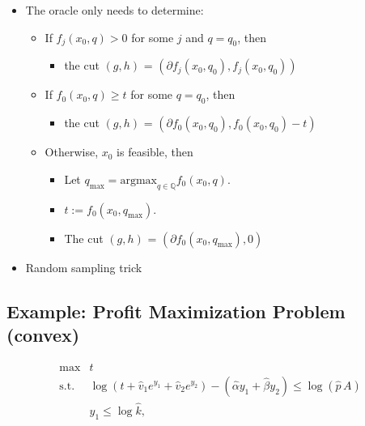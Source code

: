 \documentclass[]{article}
\providecommand{\tightlist}{%
  \setlength{\itemsep}{0pt}\setlength{\parskip}{0pt}}
\begin{document}
\begin{itemize}
\tightlist
\item
  The oracle only needs to determine:

  \begin{itemize}
  \tightlist
  \item
    If \(f_j(x_0, q) > 0\) for some \(j\) and \(q = q_0\), then

    \begin{itemize}
    \tightlist
    \item
      the cut \((g, h)\) = \((\partial f_j(x_0, q_0), f_j(x_0, q_0))\)
    \end{itemize}
  \item
    If \(f_0(x_0, q) \geq t\) for some \(q = q_0\), then

    \begin{itemize}
    \tightlist
    \item
      the cut \((g, h)\) =
      \((\partial f_0(x_0, q_0), f_0(x_0, q_0) - t)\)
    \end{itemize}
  \item
    Otherwise, \(x_0\) is feasible, then

    \begin{itemize}
    \tightlist
    \item
      Let \(q_{\max} = \text{argmax}_{q \in \mathbb Q} f_0(x_0, q)\).
    \item
      \(t := f_0(x_0, q_{\max})\).
    \item
      The cut \((g, h)\) = \((\partial f_0(x_0, q_{\max}), 0)\)
    \end{itemize}
  \end{itemize}
\item
  Random sampling trick
\end{itemize}

\hypertarget{example-profit-maximization-problem-convex}{%
\subsection{Example: Profit Maximization Problem
(convex)}\label{example-profit-maximization-problem-convex}}

\[\begin{array}{ll}
\text{max}  & t \\
\text{s.t.} & \log(t + \hat{v}_1 e^{y_1} + \hat{v}_2 e^{y_2}) - (\hat{\alpha} y_1 + \hat{\beta} y_2) \le \log(\hat{p}\,A)  \\
                  & y_1 \le \log \hat{k} ,
\end{array}\]
\end{document}
